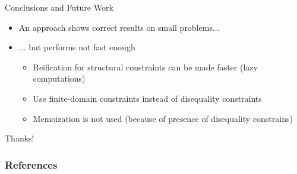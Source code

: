 \documentclass[aspectratio=169
  , xcolor={svgnames}
  , hyperref={ colorlinks,citecolor=Blue
             , linkcolor=DarkRed,urlcolor=DarkBlue}
  , russian
  ]{beamer}
\begin{document}
\begin{frame}{Conclusions and Future Work}
\begin{itemize}
\item An approach shows correct results on small problems...
\item ... but performs not fast enough
\begin{itemize}
\item Reification for structural constraints can be made faster (lazy computations)
\item Use finite-domain constraints instead of disequality constraints 
\item Memoization is not used (because of presence of disequality constrains)
\end{itemize}
\end{itemize}
\end{frame}

\begin{frame}
\begin{center}
{\Huge Thanks!}
\end{center}
\end{frame}

\begin{frame}[t, allowframebreaks]
\frametitle{References}


\vspace{1cm}
\end{frame}
\end{document}
